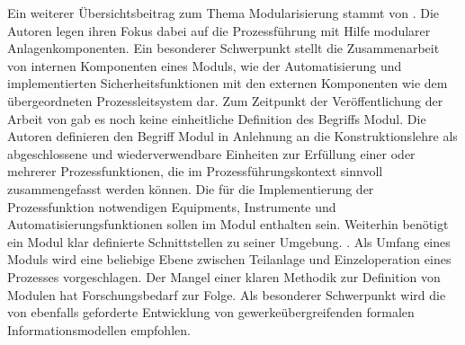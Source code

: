 Ein weiterer \"Ubersichtsbeitrag zum Thema Modularisierung stammt von \citeauthor{Urbas_2012} . Die Autoren legen ihren Fokus dabei auf die Prozessf\"uhrung mit Hilfe modularer Anlagenkomponenten. Ein besonderer Schwerpunkt stellt die Zusammenarbeit von internen Komponenten eines Moduls, wie der Automatisierung und implementierten Sicherheitsfunktionen mit den externen Komponenten wie dem \"ubergeordneten Prozessleitsystem dar. \newline
Zum Zeitpunkt der Ver\"offentlichung der Arbeit  von \citeauthor{Urbas_2012} gab es noch keine einheitliche Definition des Begriffs \glqq Modul\grqq { }. Die Autoren definieren den Begriff Modul in Anlehnung an die Konstruktionslehre als \glqq abgeschlossene und wiederverwendbare Einheiten zur Erf\"ullung einer oder mehrerer Prozessfunktionen, die im Prozessf\"uhrungskontext sinnvoll zusammengefasst werden k\"onnen.\grqq { }\cite[S. 2]{Urbas_2012} Die für die Implementierung der Prozessfunktion notwendigen Equipments, Instrumente und Automatisierungsfunktionen sollen im Modul enthalten sein. Weiterhin ben\"otigt ein Modul klar definierte Schnittstellen zu seiner Umgebung. \cite[S. 2]{Urbas_2012}. Als Umfang eines Moduls wird eine beliebige Ebene zwischen Teilanlage und Einzeloperation eines Prozesses vorgeschlagen. Der Mangel einer klaren Methodik zur Definition von Modulen hat Forschungsbedarf zur Folge. Als besonderer Schwerpunkt wird die von \citeauthor{Bramsiepe_2012} ebenfalls geforderte Entwicklung von gewerke\"ubergreifenden formalen Informationsmodellen empfohlen. \cite{Urbas_2012} \newline


